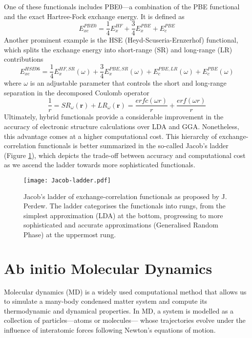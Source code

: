 One of these functionals includes PBE0\supercite{Heyd2003}---a combination of the PBE functional and the exact Hartree-Fock exchange energy. It is defined as 
\begin{equation}
  \label{eq66}
  E_{xc}^{PBE0} = \frac{1}{4}E_{x}^{HF} + \frac{3}{4}E_{x}^{PBE} + E_{c}^{PBE}
\end{equation}
Another prominent example is the HSE (Heyd-Scuseria-Ernzerhof) functional\supercite{Moussa2012}, which splits the exchange energy into short-range (SR) and long-range (LR) contributions
\begin{equation}
  \label{eq67}
  E_{xc}^{HSE06} = \frac{1}{4}E_{x}^{HF,SR}(\omega) + \frac{3}{4}E_{x}^{PBE,SR}(\omega) + E_{c}^{PBE,LR}(\omega) + E_{c}^{PBE}(\omega)
  \end{equation}
  where $\omega$ is an adjustable parameter that controls the short and long-range separation in the decomposed Coulomb operator
  \begin{equation}
    \label{eq68}
    \frac{1}{r} = SR_{\omega}(\mathbf{r}) + LR_{\omega}(\mathbf{r}) = 
    \frac{erfc(\omega r)}{r} + \frac{erf(\omega r)}{r}
  \end{equation}
Ultimately, hybrid functionals provide a considerable improvement in the accuracy of electronic structure calculations over LDA and GGA. Nonetheless, this advantage comes at a higher computational cost. This hierarchy of exchange-correlation functionals is better summarized in the so-called Jacob's ladder\supercite{Perdew2001} (Figure \ref{fig:jacob-ladder}), which depicts the trade-off between accuracy and computational cost as we ascend the ladder towards more sophisticated functionals. 
\begin{figure}[H]
  \centering
  \texttt{[image: Jacob-ladder.pdf]}
  \caption{Jacob's ladder of exchange-correlation functionals as proposed by J. Perdew\supercite{Perdew2001}. The ladder categorises the functionals into rungs, from the simplest approximation (LDA) at the bottom, progressing to more sophisticated and accurate approximations (Generalised Random Phase) at the uppermost rung.  
  }
  \label{fig:jacob-ladder}
\end{figure}


\section{Ab initio Molecular Dynamics} 
Molecular dynamics (MD)\supercite{marx2009ab, Kuhne2014} is a widely used computational method that allows us to simulate a many-body condensed matter system and compute its thermodynamic and dynamical properties. In MD, a system is modelled as a collection of particles---atoms or molecules--- whose trajectories evolve under the influence of interatomic forces following Newton's equations of motion. 


